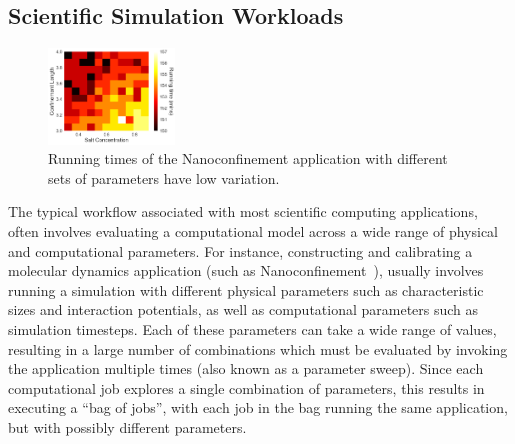 \vspace*{\subsecspace}
\subsection{Scientific Simulation Workloads}


\begin{figure}[t]
  \centering 
  \includegraphics[width=0.3\textwidth]{../graphs/hmap.png}
    \vspace*{\myfigspace}
  \caption{Running times of the Nanoconfinement application with different sets of parameters have low variation.}
  \label{fig:heatmap}
  \vspace*{\myfigspace}
\end{figure}


The typical workflow associated with most scientific computing applications, often involves evaluating a computational model across a wide range of physical and computational parameters.
For instance, constructing and calibrating a molecular dynamics application (such as Nanoconfinement~\cite{kadupitiya2017}), usually involves running a simulation with different physical parameters such as characteristic sizes and interaction potentials, as well as computational parameters such as simulation timesteps. 
Each of these parameters can take a wide range of values, resulting in a large number of combinations which must be evaluated by invoking the application multiple times (also known as a parameter sweep). 
Since each computational job explores a single combination of parameters, this results in executing a ``bag of jobs'', with each job in the bag running the same application, but with possibly different parameters.



